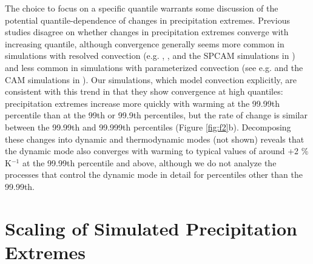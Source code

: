 \documentclass[twocol]{ametsoc}
\begin{document}
The choice to focus on a specific quantile warrants some discussion of the potential quantile-dependence of changes in precipitation extremes. Previous studies disagree on whether changes in precipitation extremes converge with increasing quantile, although convergence generally seems more common in simulations with resolved convection (e.g. \citet{Muller2011IntensificationModel}, \citet{Muller2013ImpactWarming}, and the SPCAM simulations in \citet{Fildier2017SimultaneousChange}) and less common in simulations with parameterized convection (see e.g. \citet{Pendergrass2014ChangesWarming} and the CAM simulations in \citet{Fildier2017SimultaneousChange}). Our simulations, which model convection explicitly, are consistent with this trend in that they show convergence at high quantiles: precipitation extremes increase more quickly with warming at the 99.99th percentile than at the 99th or 99.9th percentiles, but the rate of change is similar between the 99.99th and 99.999th percentiles (Figure \ref{fig:f2}b). Decomposing these changes into dynamic and thermodynamic modes (not shown) reveals that the dynamic mode also converges with warming to typical values of around +2 \% K$^{-1}$ at the 99.99th percentile and above, although we do not analyze the processes that control the dynamic mode in detail for percentiles other than the 99.99th.

\section{Scaling of Simulated Precipitation Extremes} \label{sec:scal}
\end{document}
